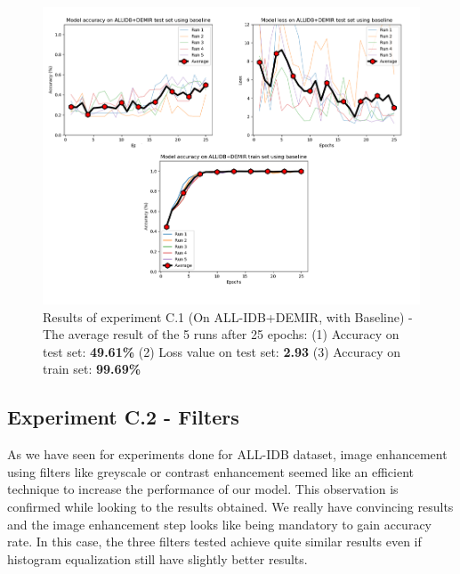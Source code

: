 \documentclass[11pt, openany]{report}
\theoremstyle{plain}
\theoremstyle{definition}
\theoremstyle{remark}
\begin{document}
\begin{figure}[H]
  \centering
  \includegraphics[scale=0.42]{Code/ch6-LeukemiaSubtypes/figures_result/LEUK-SUBTYPES/leukSub-baseline.PNG}
  \caption{Results of experiment C.1 (On ALL-IDB+DEMIR, with Baseline) - The average result of the 5 runs after 25 epochs: (1) Accuracy on test set: \textbf{49.61\%} (2) Loss value on test set: \textbf{2.93} (3) Accuracy on train set: \textbf{99.69\%}}
  \label{fig:results-C1}
\end{figure}


\subsection{Experiment C.2 - Filters}

As we have seen for experiments done for ALL-IDB dataset, image enhancement using filters like greyscale or contrast enhancement seemed like an efficient technique to increase the performance of our model. This observation is confirmed while looking to the results obtained. We really have convincing results and the image enhancement step looks like being mandatory to gain accuracy rate. In this case, the three filters tested achieve quite similar results even if histogram equalization still have slightly better results.  
\end{document}
